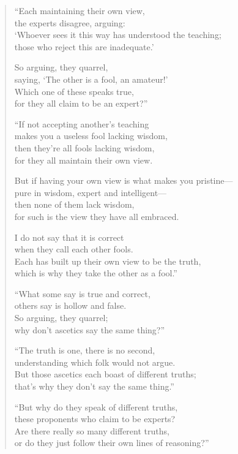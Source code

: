 \documentclass[12pt,openany]{book}%
\begin{document}
\begin{verse}%
“Each maintaining their own view, \\
the experts disagree, arguing: \\
‘Whoever sees it this way has understood the teaching; \\
those who reject this are inadequate.’ 

So arguing, they quarrel, \\
saying, ‘The other is a fool, an amateur!’ \\
Which one of these speaks true, \\
for they all claim to be an expert?” 

“If not accepting another’s teaching \\
makes you a useless fool lacking wisdom, \\
then they’re all fools lacking wisdom, \\
for they all maintain their own view. 

But if having your own view is what makes you pristine—\\
pure in wisdom, expert and intelligent—\\
then none of them lack wisdom, \\
for such is the view they have all embraced. 

I do not say that it is correct \\
when they call each other fools. \\
Each has built up their own view to be the truth, \\
which is why they take the other as a fool.” 

“What some say is true and correct, \\
others say is hollow and false. \\
So arguing, they quarrel; \\
why don’t ascetics say the same thing?” 

“The truth is one, there is no second, \\
understanding which folk would not argue. \\
But those ascetics each boast of different truths; \\
that’s why they don’t say the same thing.” 

“But why do they speak of different truths, \\
these proponents who claim to be experts? \\
Are there really so many different truths, \\
or do they just follow their own lines of reasoning?” 


\end{verse}
\end{document}
